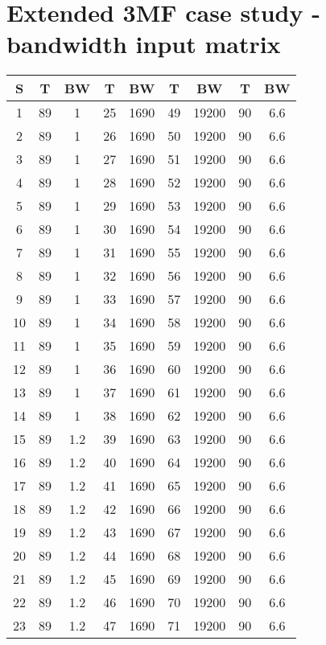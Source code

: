 \clearpage
\section{Extended 3MF case study - bandwidth input matrix}
\label{apdx:validbw}

\begin{center}
\begin{footnotesize}
\begin{tabular}{|c|cccccccc|}
\hline
S & T & BW & T & BW & T & BW & T & BW\\
\hline
1 & 89 & 1 & 25 & 1690 & 49 & 19200 & 90 & 6.6 \\
2 & 89 & 1 & 26 & 1690 & 50 & 19200 & 90 & 6.6 \\
3 & 89 & 1 & 27 & 1690 & 51 & 19200 & 90 & 6.6 \\
4 & 89 & 1 & 28 & 1690 & 52 & 19200 & 90 & 6.6 \\
5 & 89 & 1 & 29 & 1690 & 53 & 19200 & 90 & 6.6 \\
6 & 89 & 1 & 30 & 1690 & 54 & 19200 & 90 & 6.6 \\
7 & 89 & 1 & 31 & 1690 & 55 & 19200 & 90 & 6.6 \\
8 & 89 & 1 & 32 & 1690 & 56 & 19200 & 90 & 6.6 \\
9 & 89 & 1 & 33 & 1690 & 57 & 19200 & 90 & 6.6 \\
10 & 89 & 1 & 34 & 1690 & 58 & 19200 & 90 & 6.6 \\
11 & 89 & 1 & 35 & 1690 & 59 & 19200 & 90 & 6.6 \\
12 & 89 & 1 & 36 & 1690 & 60 & 19200 & 90 & 6.6 \\
13 & 89 & 1 & 37 & 1690 & 61 & 19200 & 90 & 6.6 \\
14 & 89 & 1 & 38 & 1690 & 62 & 19200 & 90 & 6.6 \\
15 & 89 & 1.2 & 39 & 1690 & 63 & 19200 & 90 & 6.6 \\
16 & 89 & 1.2 & 40 & 1690 & 64 & 19200 & 90 & 6.6 \\
17 & 89 & 1.2 & 41 & 1690 & 65 & 19200 & 90 & 6.6 \\
18 & 89 & 1.2 & 42 & 1690 & 66 & 19200 & 90 & 6.6 \\
19 & 89 & 1.2 & 43 & 1690 & 67 & 19200 & 90 & 6.6 \\
20 & 89 & 1.2 & 44 & 1690 & 68 & 19200 & 90 & 6.6 \\
21 & 89 & 1.2 & 45 & 1690 & 69 & 19200 & 90 & 6.6 \\
22 & 89 & 1.2 & 46 & 1690 & 70 & 19200 & 90 & 6.6 \\
23 & 89 & 1.2 & 47 & 1690 & 71 & 19200 & 90 & 6.6 \\

\end{tabular}
\end{footnotesize}
\end{center}
